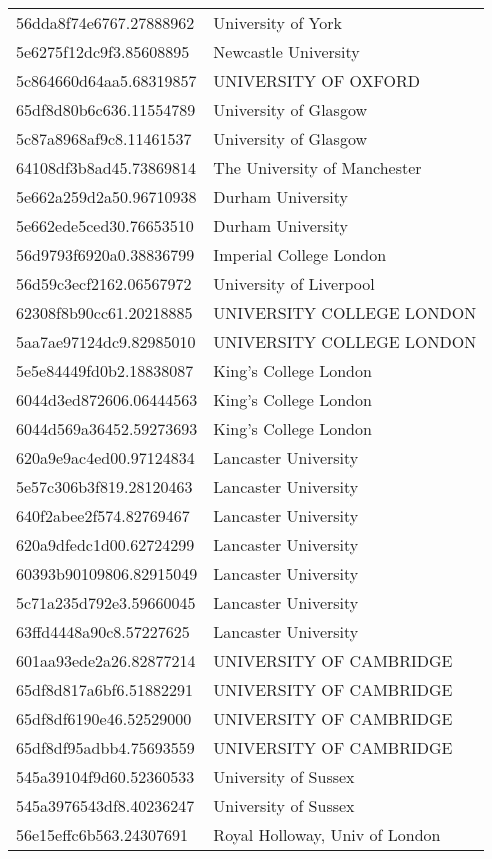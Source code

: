 \begin{tabular}{ll}
56dda8f74e6767.27888962 & University of York \\
5e6275f12dc9f3.85608895 & Newcastle University \\
5c864660d64aa5.68319857 & UNIVERSITY OF OXFORD \\
65df8d80b6c636.11554789 & University of Glasgow \\
5c87a8968af9c8.11461537 & University of Glasgow \\
64108df3b8ad45.73869814 & The University of Manchester \\
5e662a259d2a50.96710938 & Durham University \\
5e662ede5ced30.76653510 & Durham University \\
56d9793f6920a0.38836799 & Imperial College London \\
56d59c3ecf2162.06567972 & University of Liverpool \\
62308f8b90cc61.20218885 & UNIVERSITY COLLEGE LONDON \\
5aa7ae97124dc9.82985010 & UNIVERSITY COLLEGE LONDON \\
5e5e84449fd0b2.18838087 & King's College London \\
6044d3ed872606.06444563 & King's College London \\
6044d569a36452.59273693 & King's College London \\
620a9e9ac4ed00.97124834 & Lancaster University \\
5e57c306b3f819.28120463 & Lancaster University \\
640f2abee2f574.82769467 & Lancaster University \\
620a9dfedc1d00.62724299 & Lancaster University \\
60393b90109806.82915049 & Lancaster University \\
5c71a235d792e3.59660045 & Lancaster University \\
63ffd4448a90c8.57227625 & Lancaster University \\
601aa93ede2a26.82877214 & UNIVERSITY OF CAMBRIDGE \\
65df8d817a6bf6.51882291 & UNIVERSITY OF CAMBRIDGE \\
65df8df6190e46.52529000 & UNIVERSITY OF CAMBRIDGE \\
65df8df95adbb4.75693559 & UNIVERSITY OF CAMBRIDGE \\
545a39104f9d60.52360533 & University of Sussex \\
545a3976543df8.40236247 & University of Sussex \\
56e15effc6b563.24307691 & Royal Holloway, Univ of London \\

\end{tabular}

